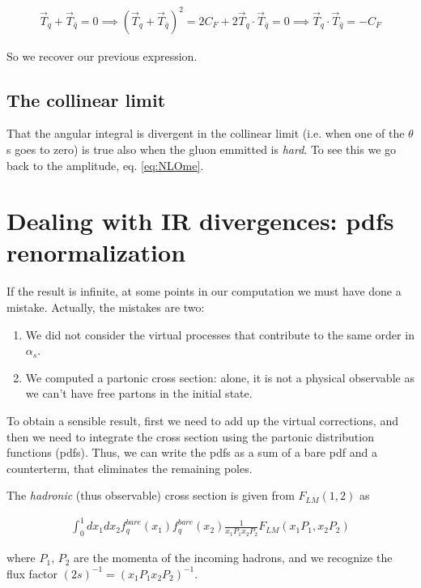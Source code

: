\documentclass[11pt]{report}
\begin{document}
\begin{align}
    \vec{T}_q + \vec{T}_{\bar{q}} = 0 \implies (\vec{T}_q + \vec{T}_{\bar{q}})^2 = 2C_F +2\vec{T}_q \cdot \vec{T}_{\bar{q}} = 0 \implies \vec{T}_q \cdot \vec{T}_{\bar{q}} = -C_F 
\end{align}

So we recover our previous expression. 

\subsection{The collinear limit}

That the angular integral is divergent in the collinear limit (i.e. when one of the \(\theta\)s goes to zero) is true also when the gluon emmitted is \emph{hard}. To see this we go back to the amplitude, eq. \ref{eq:NLOme}. 

\section{Dealing with IR divergences: pdfs renormalization}

If the result is infinite, at some points in our computation we must have done a mistake. Actually, the mistakes are two: 

\begin{enumerate}
    \item We did not consider the virtual processes that contribute to the same order in \(\alpha_s\). 
    \item We computed a partonic cross section: alone, it is not a physical observable as we can't have free partons in the initial state. 
\end{enumerate}

To obtain a sensible result, first we need to add up the virtual corrections, and then we need to integrate the cross section using the partonic distribution functions (pdfs). Thus, we can write the pdfs as a sum of a bare pdf and a counterterm, that eliminates the remaining poles. 

The \emph{hadronic} (thus observable) cross section is given from \(F_{LM}(1, 2)\) as 

\begin{align}
    \label{eq:hadcrosssec}
    \int_0^1 dx_1 dx_2 f_q^{bare}(x_1)f_q^{bare}(x_2)\frac{1}{x_1P_1 x_2P_2}F_{LM}(x_1P_1, x_2P_2)
\end{align}

where \(P_1, \, P_2\) are the momenta of the incoming hadrons, and we recognize the flux factor \((2s)^{-1} = (x_1P_1 x_2P_2)^{-1}\). 
 
\end{document}
